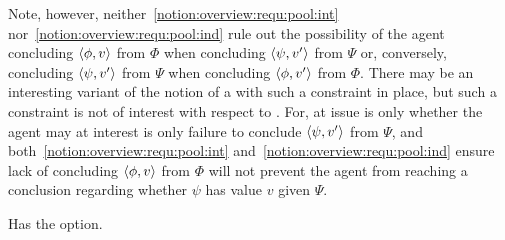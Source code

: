 \begin{note}
  Note, however, neither~\ref{notion:overview:requ:pool:int} nor~\ref{notion:overview:requ:pool:ind} rule out the possibility of the agent concluding \(\langle \phi, v \rangle\) from \(\Phi\) when concluding \(\langle \psi, v' \rangle\) from \(\Psi\) or, conversely, concluding \(\langle \psi, v' \rangle\) from \(\Psi\) when concluding \(\langle \phi, v' \rangle\) from \(\Phi\).
  There may be an interesting variant of the notion of a \requ{} with such a constraint in place, but such a constraint is not of interest with respect to \qzs{}.
  For, at issue is only whether the agent may at interest is only failure to conclude \(\langle \psi, v' \rangle\) from \(\Psi\), and both~\ref{notion:overview:requ:pool:int} and~\ref{notion:overview:requ:pool:ind} ensure lack of concluding \(\langle \phi, v \rangle\) from \(\Phi\) will not prevent the agent from reaching a conclusion regarding whether \(\psi\) has value \(v\) given \(\Psi\).
\end{note}

\begin{note}
  \color{red}
  Has the option.
\end{note}

